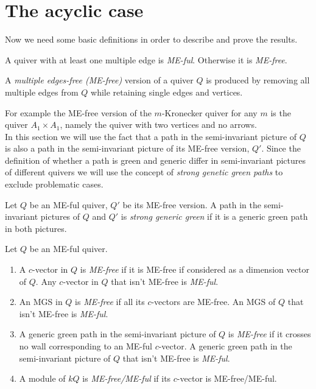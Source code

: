 \section{The acyclic case}
\indent Now we need some basic definitions in order to describe and prove the results.
\begin{definition}
A quiver with at least one multiple edge is \textit{ME-ful}. Otherwise it is \textit{ME-free}.
\end{definition}
\begin{definition}
A \textit{multiple edges-free (ME-free)} version of a quiver $Q$ is produced by removing all multiple edges from $Q$ while retaining single edges and vertices.
\end{definition}
\indent For example the ME-free version of the $m$-Kronecker quiver for any $m$ is the quiver $A_1\times A_1$, namely the quiver with two vertices and no arrows.\\
\indent In this section we will use the fact that a path in the semi-invariant picture of $Q$ is also a path in the semi-invariant picture of its ME-free version, $Q'$. Since the definition of whether a path is green and generic differ in semi-invariant pictures of different quivers we will use the concept of \textit{strong genetic green paths} to exclude problematic cases.
\begin{definition}
Let $Q$ be an ME-ful quiver, $Q'$ be its ME-free version. A path in the semi-invariant pictures of $Q$ and $Q'$ is \textit{strong generic green} if it is a generic green path in both pictures.
\end{definition}
\begin{definition}
Let $Q$ be an ME-ful quiver.
\begin{enumerate}
\item A $c$-vector in $Q$ is \textit{ME-free} if it is ME-free if considered as a dimension vector of $Q$. Any $c$-vector in $Q$ that isn't ME-free is \textit{ME-ful}.
\item An MGS in $Q$ is \textit{ME-free} if all its $c$-vectors are ME-free. An MGS of $Q$ that isn't ME-free is \textit{ME-ful}.
\item A generic green path in the semi-invariant picture of $Q$ is \textit{ME-free} if it crosses no wall corresponding to an ME-ful $c$-vector. A generic green path in the semi-invariant picture of $Q$ that isn't ME-free is \textit{ME-ful}.
\item A module of $kQ$ is \textit{ME-free/ME-ful} if its $c$-vector is ME-free/ME-ful.
\end{enumerate}
\end{definition}
